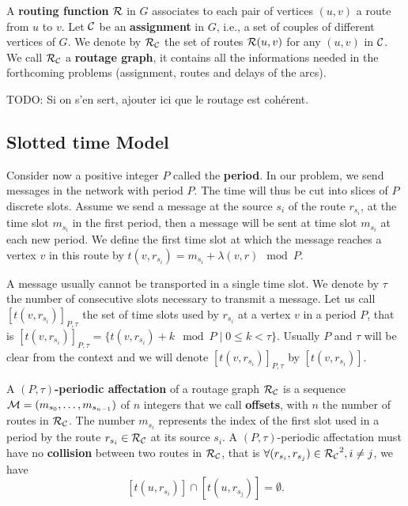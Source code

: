 \documentclass[a4paper,10pt]{article}
\newcommand{\todo}[1]{{\color{red} TODO: {#1}}}
\begin{document}
      A {\bf routing function} $\cal R$ in $G$ associates to each pair of vertices $(u,v)$ a route from $u$ to $v$. Let $\cal C$ be an {\bf assignment} in $G$, i.e., a set of couples of different vertices of $G$. We denote by $\cal R_{\cal C}$ the set of routes ${\cal R}(u,v)$ for any $(u,v)$ in $\cal C$. We call $\cal R_{\cal C}$ a {\bf routage graph}, it contains all the informations needed in the forthcoming problems (assignment, routes and delays of the arcs). 
      

      \todo{Si on s'en sert, ajouter ici que le routage est cohérent.}

   \subsection{Slotted time Model}
      Consider now a positive integer $P$ called the {\bf period}. In our problem, we send messages in the network with period $P$. The time will thus be cut into slices of $P$ discrete slots. Assume we send a message at the source $s_i$ of the route $r_{s_i}$, at the time slot $m_{s_i}$ in the first period, then a message will be sent at time slot $m_{s_i}$ at each new period. We define the first time slot at which the message reaches a vertex $v$ in this route by $t(v,r_{s_i}) = m_{s_i} + \lambda(v,r) \mod P$. 

      A message usually cannot be transported in a single time slot. We denote by $\tau$ the number 
      of consecutive slots necessary to transmit a message. Let us call $[t(v,r_{s_i})]_{P,\tau}$ the set of time slots used by $r_{s_i}$ at a vertex $v$ in a period $P$, that is $[t(v,r_{s_i})]_{P,\tau} = \{t(v,r_{s_i}) + k \mod P \mid 0 \leq k < \tau \}$. Usually $P$ and $\tau$ will be clear from the context and we will denote $[t(v,r_{s_i})]_{P,\tau}$ by $[t(v,r_{s_i})]$.
      
      
      A {\bf $(P,\tau)$-periodic affectation} of a routage graph $\cal R_{\cal C}$ is a sequence  ${\cal M}=(m_{s_0}, \ldots ,m_{s_{n-1}})$ of $n$ integers that we call {\bf offsets}, with $n$ the number of routes in $\cal R_{\cal C}$. The number $m_{s_i}$ represents the index of the first slot used in a period  by the route $r_{s_i} \in \cal R_{\cal C}$ at its source $s_i$.
      A $(P,\tau)$-periodic affectation must have no {\bf collision} between two routes in $\cal R_{\cal C}$, that is $\forall (r_{s_i}, r_{s_j}) \in {\cal R_{\cal C}}^2, i \neq j$, %
      we have $$[t(u,r_{s_i})] \cap [t(u,r_{s_j})] = \emptyset .$$
      
\end{document}
